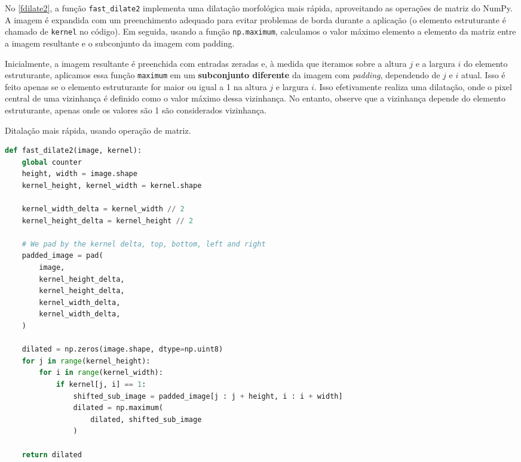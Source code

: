 \documentclass[english, 
               brazil, 
               bsc] %
               {dcomp-abntex2}
\begin{document}
No \autoref{fdilate2}, a função \texttt{fast\_dilate2} implementa uma dilatação morfológica mais rápida, aproveitando as operações de matriz do NumPy. A imagem é expandida com um preenchimento adequado para evitar problemas de borda durante a aplicação (o elemento estruturante é chamado de \texttt{kernel} no código). Em seguida, usando a função \texttt{np.maximum}, calculamos o valor máximo elemento a elemento da matriz entre a imagem resultante e o subconjunto da imagem com padding.

Inicialmente, a imagem resultante é preenchida com entradas zeradas e, à medida que iteramos sobre a altura $j$ e a largura $i$ do elemento estruturante, aplicamos essa função \texttt{maximum} em um  \textbf{subconjunto diferente} da imagem com \textit{padding}, dependendo de $j$ e $i$ atual. Isso é feito apenas se o elemento estruturante for maior ou igual a 1 na altura $j$ e largura $i$. Isso efetivamente realiza uma dilatação, onde o pixel central de uma vizinhança é definido como o valor máximo dessa vizinhança. No entanto, observe que a vizinhança depende do elemento estruturante, apenas onde os valores são 1 são considerados vizinhança.

\begin{codigo}[h]
  \caption{\small Ditalação mais rápida, usando operação de matriz.}
 \label{fdilate2}
\begin{lstlisting}[language=python]
def fast_dilate2(image, kernel):
    global counter 
    height, width = image.shape
    kernel_height, kernel_width = kernel.shape

    kernel_width_delta = kernel_width // 2
    kernel_height_delta = kernel_height // 2

    # We pad by the kernel delta, top, bottom, left and right
    padded_image = pad(
        image,
        kernel_height_delta,
        kernel_height_delta,
        kernel_width_delta,
        kernel_width_delta,
    )

    dilated = np.zeros(image.shape, dtype=np.uint8)
    for j in range(kernel_height):
        for i in range(kernel_width):
            if kernel[j, i] == 1:
                shifted_sub_image = padded_image[j : j + height, i : i + width]
                dilated = np.maximum(
                    dilated, shifted_sub_image
                )

    return dilated
\end{lstlisting}
\end{codigo}
\end{document}
